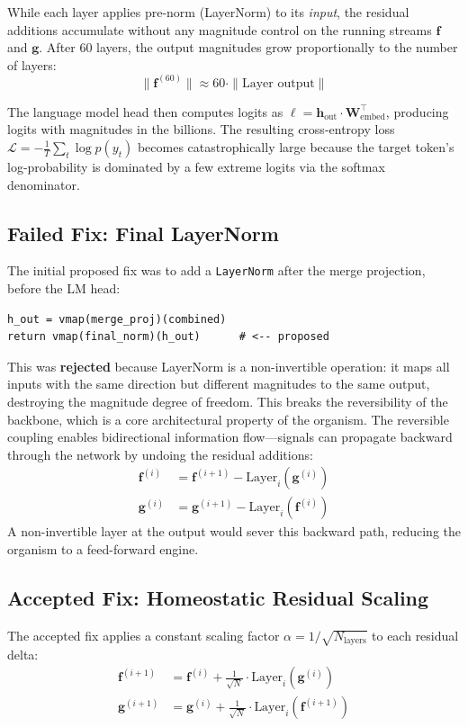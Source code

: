 While each layer applies pre-norm (LayerNorm) to its \emph{input}, the residual additions accumulate without any magnitude control on the running streams $\mathbf{f}$ and $\mathbf{g}$. After 60 layers, the output magnitudes grow proportionally to the number of layers:
\[
    \|\mathbf{f}^{(60)}\| \approx 60 \cdot \|\text{Layer output}\|
\]

The language model head then computes logits as $\ell = \mathbf{h}_{\text{out}} \cdot \mathbf{W}_{\text{embed}}^\top$, producing logits with magnitudes in the billions. The resulting cross-entropy loss $\mathcal{L} = -\frac{1}{T}\sum_t \log p(y_t)$ becomes catastrophically large because the target token's log-probability is dominated by a few extreme logits via the softmax denominator.

\subsection{Failed Fix: Final LayerNorm}

The initial proposed fix was to add a \texttt{LayerNorm} after the merge projection, before the LM head:
\begin{verbatim}
h_out = vmap(merge_proj)(combined)
return vmap(final_norm)(h_out)      # <-- proposed
\end{verbatim}

This was \textbf{rejected} because LayerNorm is a non-invertible operation: it maps all inputs with the same direction but different magnitudes to the same output, destroying the magnitude degree of freedom. This breaks the reversibility of the backbone, which is a core architectural property of the organism. The reversible coupling enables bidirectional information flow---signals can propagate backward through the network by undoing the residual additions:
\begin{align}
    \mathbf{f}^{(i)} &= \mathbf{f}^{(i+1)} - \text{Layer}_i(\mathbf{g}^{(i)}) \\
    \mathbf{g}^{(i)} &= \mathbf{g}^{(i+1)} - \text{Layer}_i(\mathbf{f}^{(i)})
\end{align}
A non-invertible layer at the output would sever this backward path, reducing the organism to a feed-forward engine.

\subsection{Accepted Fix: Homeostatic Residual Scaling}

The accepted fix applies a constant scaling factor $\alpha = 1/\sqrt{N_{\text{layers}}}$ to each residual delta:
\begin{align}
    \mathbf{f}^{(i+1)} &= \mathbf{f}^{(i)} + \frac{1}{\sqrt{N}} \cdot \text{Layer}_i(\mathbf{g}^{(i)}) \\
    \mathbf{g}^{(i+1)} &= \mathbf{g}^{(i)} + \frac{1}{\sqrt{N}} \cdot \text{Layer}_i(\mathbf{f}^{(i+1)})
\end{align}

